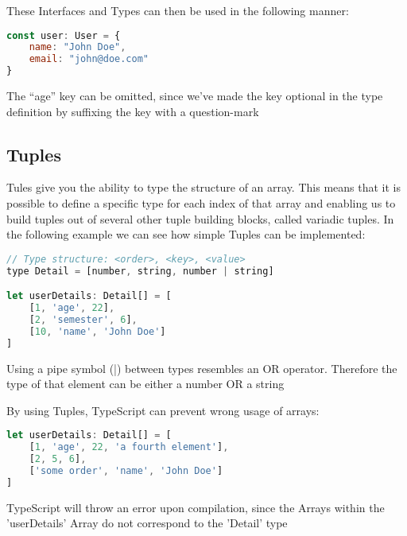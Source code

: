 \documentclass[letterpaper,runningheads]{llncs}
\begin{document}
These Interfaces and Types can then be used in the following manner:

\begin{lstlisting}[style=ES6, language=JavaScript, caption="Interface and Type usage"]
const user: User = {
	name: "John Doe",
	email: "john@doe.com"
}
\end{lstlisting}

\begin{note}
The ``age'' key can be omitted, since we've made the key optional
in the type definition by suffixing the key with a question-mark
\end{note}


\subsection{Tuples}

Tules give you the ability to type the structure of an array. This
means that it is possible to define a specific type for each index
of that array and enabling us to build tuples out of several other
tuple building blocks, called variadic tuples. In the following example
we can see how simple Tuples can be implemented:

\begin{lstlisting}[style=ES6, language=JavaScript, caption="Tuple usage"]
// Type structure: <order>, <key>, <value>
type Detail = [number, string, number | string]

let userDetails: Detail[] = [
	[1, 'age', 22],
	[2, 'semester', 6],
	[10, 'name', 'John Doe']
]
\end{lstlisting}

\begin{note}
Using a pipe symbol (|) between types resembles an OR operator. Therefore
the type of that element can be either a number OR a string
\end{note}

By using Tuples, TypeScript can prevent wrong usage of arrays:

\begin{lstlisting}[style=ES6, language=JavaScript, caption="Problematic Tuple usage"]
let userDetails: Detail[] = [
	[1, 'age', 22, 'a fourth element'],
	[2, 5, 6],
	['some order', 'name', 'John Doe']
]
\end{lstlisting}

\begin{problem}
TypeScript will throw an error upon compilation, since the Arrays
within the 'userDetails' Array do not correspond to the 'Detail' type
\end{problem}
\end{document}
